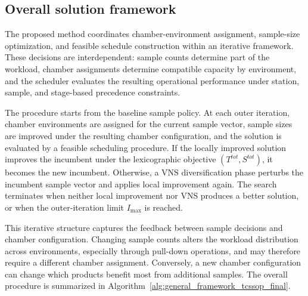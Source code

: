 \documentclass[11pt]{article}
\begin{document}
\subsection{Overall solution framework}
\label{subsec:framework}

The proposed method coordinates chamber-environment assignment, sample-size optimization, and feasible schedule construction within an iterative framework. These decisions are interdependent: sample counts determine part of the workload, chamber assignments determine compatible capacity by environment, and the scheduler evaluates the resulting operational performance under station, sample, and stage-based precedence constraints.

The procedure starts from the baseline sample policy. At each outer iteration, chamber environments are assigned for the current sample vector, sample sizes are improved under the resulting chamber configuration, and the solution is evaluated by a feasible scheduling procedure. If the locally improved solution improves the incumbent under the lexicographic objective \((T^{tot},S^{tot})\), it becomes the new incumbent. Otherwise, a VNS diversification phase perturbs the incumbent sample vector and applies local improvement again. The search terminates when neither local improvement nor VNS produces a better solution, or when the outer-iteration limit \(I_{\max}\) is reached.

This iterative structure captures the feedback between sample decisions and chamber configuration. Changing sample counts alters the workload distribution across environments, especially through pull-down operations, and may therefore require a different chamber assignment. Conversely, a new chamber configuration can change which products benefit most from additional samples. The overall procedure is summarized in Algorithm~\ref{alg:general_framework_tcssop_final}.
\end{document}
